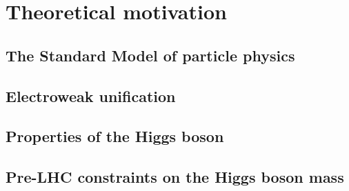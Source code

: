
\chapter{Theoretical motivation}
\label{chap:motivation}

\section{The Standard Model of particle physics}
	\label{sec:sm}
	
\section{Electroweak unification}
	\label{sec:ewsb}
	
\section{Properties of the Higgs boson}
	\label{sec:properties}
	
\section{Pre-LHC constraints on the Higgs boson mass}
	\label{sec:prior_constraints}
	



